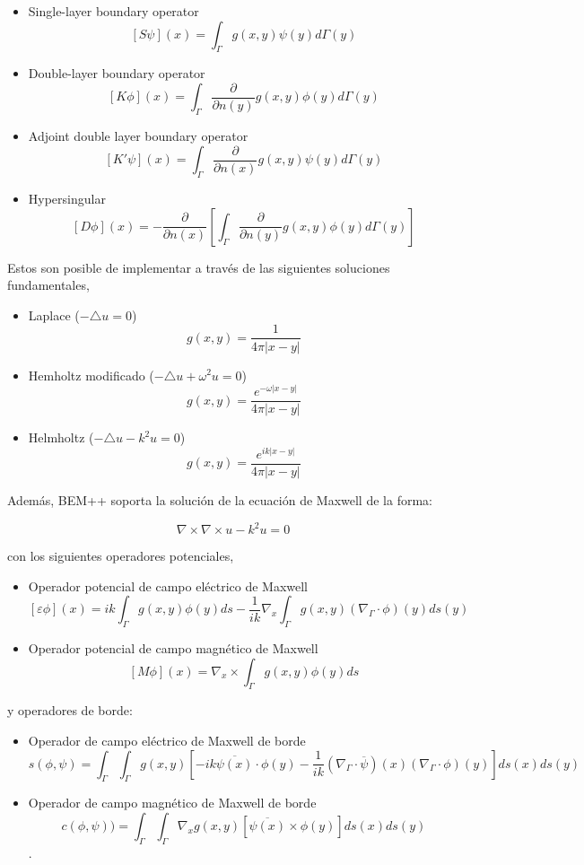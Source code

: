 \documentclass[12pt,letterpaper]{report}
\numberwithin{equation}{section}
\begin{document}
\begin{itemize}
	\item Single-layer boundary operator 
	$$[S\psi](x)=\int_{\Gamma}g(x,y)\psi(y) d\varGamma(y)$$
	\item Double-layer boundary operator $$[K\phi](x)=\int_{\Gamma}\frac{\partial}{\partial n(y)} g(x,y)\phi(y) d\varGamma(y)$$
	\item Adjoint double layer boundary operator
	$$[K'\psi](x)=\int_{\Gamma}\frac{\partial}{\partial n(x)}g(x,y)\psi(y) d\varGamma(y)$$
	\item Hypersingular
	$$[D\phi](x)=-\frac{\partial}{\partial n(x)}\left[ \int_{\Gamma}\frac{\partial}{\partial n(y)} g(x,y)\phi(y) d\varGamma(y)\right]$$
\end{itemize}

Estos son posible de implementar a través de las siguientes soluciones fundamentales,

\begin{itemize}
	\item Laplace ($-\triangle u=0$)
	$$g(x,y)=\frac{1}{4\pi |x-y|}$$
	\item Hemholtz modificado ($-\triangle u+\omega^2u=0$)
	$$g(x,y)=\frac{e^{-\omega|x-y|}}{4\pi |x-y|}$$
	\item Helmholtz ($-\triangle u-k^2u=0$)
	$$g(x,y)=\frac{e^{ik|x-y|}}{4\pi |x-y|}$$
\end{itemize}

Además, BEM++ soporta la solución de la ecuación de Maxwell de la forma:

$$\nabla\times\nabla\times u-k^2u=0$$

\noindent con los siguientes operadores potenciales,
\begin{itemize}
	\item Operador potencial de campo eléctrico de Maxwell 
	$$\left[\varepsilon\phi \right](x)=ik\int_{\Gamma}g(x,y)\phi(y)ds-\frac{1}{ik}\nabla_x\int_{\Gamma}g(x,y)(\nabla_\Gamma\cdotp\phi)(y)ds(y)$$
	\item Operador potencial de campo magnético de Maxwell
	$$\left[M\phi \right](x)=\nabla_x\times\int_{\Gamma}g(x,y)\phi(y)ds$$
\end{itemize}

\noindent y operadores de borde:
\begin{itemize}
	\item Operador de campo eléctrico de Maxwell de borde
	$$s(\phi,\psi)=\int_{\Gamma}\int_{\Gamma}g(x,y)\left[ -ik\overline{\psi (x)}\cdotp\phi(y)-\frac{1}{ik}\left( \nabla_\Gamma\cdotp\overline{\psi}\right) (x)\left( \nabla_\Gamma\cdotp\phi\right) (y)\right] ds(x)ds(y)$$
	\item Operador de campo magnético de Maxwell de borde
	$$c(\phi,\psi))=\int_{\Gamma}\int_{\Gamma}\nabla_xg(x,y)\left[\overline{\psi (x)}\times\phi(y) \right] ds(x)ds(y)$$.
\end{itemize}
\end{document}
